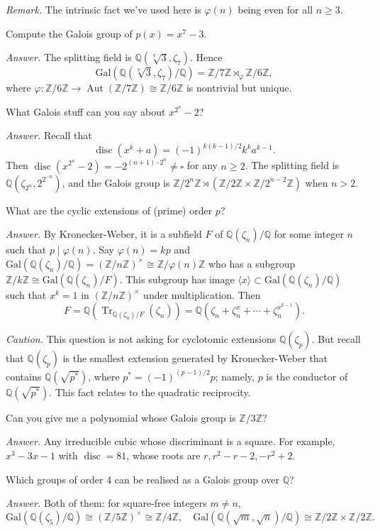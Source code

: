 \documentclass{mathproblems}
\newcommand\Q{\mathbb{Q}}
\newcommand\Z{\mathbb{Z}}
\newcommand\Gal{\mathrm{Gal}}
\begin{document}
\begin{questions}
\textit{Remark.} The intrinsic fact we've used here is $\varphi(n)$ being even for all $n\geq 3$.

\miquestion
{\color{blue} Compute the Galois group of $p(x)=x^{7}-3$.}

\textit{Answer.}
The splitting field is $\Q(\sqrt[7]{3},\zeta_7)$. Hence
$$
\Gal(\Q(\sqrt[7]{3},\zeta_7)/\Q)=\Z/7\Z \rtimes_{\varphi} \Z/6\Z,
$$
where $\varphi: \Z/6\Z \to \operatorname{Aut}(\Z/7\Z)\cong \Z/6\Z$ is nontrivial but unique.

\miquestion
{\color{blue} What Galois stuff can you say about $x^{2^{n}}-2$?}

\textit{Answer.}
Recall that
$$
\operatorname{disc}(x^k+a)=(-1)^{k(k-1)/2}k^k a^{k-1}.
$$
Then $\operatorname{disc}(x^{2^{n}}-2)=-2^{(n+1)\cdot 2^n}\neq \square$ for any $n\geq 2$. The splitting field is $\Q(\zeta_{2^n},2^{2^{-n}})$, and the Galois group is $\Z/2^{n}\Z\rtimes (\Z/2\Z\times \Z/2^{n-2}\Z)$ when $n>2$.

\miquestion
{\color{blue} What are the cyclic extensions of (prime) order $p$?}

\textit{Answer.} By Kronecker-Weber, it is a subfield $F$ of $\Q(\zeta_n)/\Q$ for some integer $n$ such that $p\mid \varphi(n)$. Say $\varphi(n)=kp$ and $\Gal(\Q(\zeta_n)/\Q)=(\Z/n\Z)^\times\cong \Z/\varphi(n)\Z$ who has a subgroup $\Z/k\Z\cong \Gal(\Q(\zeta_n)/F)$. This subgroup has image $\langle x \rangle\subset \Gal(\Q(\zeta_n)/\Q)$ such that $x^k=1$ in $(\Z/n\Z)^\times$ under multiplication. Then
$$
F=\Q(\operatorname{Tr}_{\Q(\zeta_n)/F}(\zeta_n))=\Q(\zeta_n+\zeta_n^x+\cdots +\zeta_n^{x^{k-1}}).
$$


\textit{Caution.} This question is not asking for cyclotomic extensions $\Q(\zeta_p)$. But recall that $\Q(\zeta_p)$ is the smallest extension generated by Kronecker-Weber that contains $\Q(\sqrt{p^*})$, where $p^*=(-1)^{(p-1)/2}p$; namely, $p$ is the conductor of $\Q(\sqrt{p^*})$. This fact relates to the quadratic reciprocity.

\miquestion
{\color{blue} Can you give me a polynomial whose Galois group is $\Z / 3 \Z$?}

\textit{Answer.} Any irreducible cubic whose discriminant is a square. For example, $x^3-3x-1$ with $\operatorname{disc}=81$, whose roots are $r, r^2-r-2, -r^2+2$.

\miquestion
{\color{blue} Which groups of order 4 can be realised as a Galois group over $\Q$?}

\textit{Answer.} Both of them: for square-free integers $m\neq n$,
$$
\Gal(\Q(\zeta_5)/\Q)\cong (\Z/5\Z)^\times \cong \Z/4\Z,\quad \Gal(\Q(\sqrt{m},\sqrt{n})/\Q)\cong \Z/2\Z\times \Z/2\Z.
$$


\end{questions}
\end{document}
